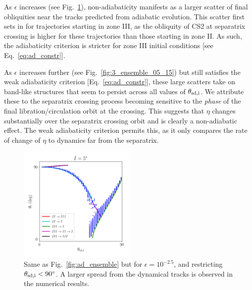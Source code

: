 \documentclass[
        fleqn,
        usenatbib,
    ]{mnras}
\begin{document}
As $\epsilon$ increases (see Fig.~\ref{fig:3_ensemble_05_25}), non-adiabaticity
manifests as a larger scatter of final obliquities near the tracks predicted
from adiabatic evolution. This scatter first sets in for trajectories starting
in zone III, as the obliquity of CS2 at separatrix crossing is higher for these
trajectories than those starting in zone II\@. As such, the adiabaticity criterion
is stricter for zone III initial conditions [see Eq.~\eqref{eq:ad_constr}].

As $\epsilon$ increases further (see Fig.~\ref{fig:3_ensemble_05_15}) but still
satisfies the weak adiabaticity criterion [Eq.~\eqref{eq:ad_constr}], these
large scatters take on band-like structures that seem to persist across all
values of $\theta_{\rm sd, i}$. We attribute these to the separatrix crossing
process becoming sensitive to the \emph{phase} of the final
libration/circulation orbit at the crossing. This suggests that $\eta$
changes substantially over the separatrix crossing orbit and is clearly a
non-adiabatic effect. The weak adiabaticity criterion permits this, as it only
compares the rate of change of $\eta$ to dynamics far from the separatrix.
\begin{figure}
    \centering
    \includegraphics[width=0.5\textwidth]{plots_diskdisp/3_ensemble_05_25.png}
    \caption{Same as Fig.~\ref{fig:ad_ensemble} but for $\epsilon = 10^{-2.5}$,
    and restricting $\theta_{\rm sd, i} < 90^\circ$. A larger spread from the
    dynamical tracks is observed in the numerical results.
    }\label{fig:3_ensemble_05_25}
\end{figure}
\end{document}
